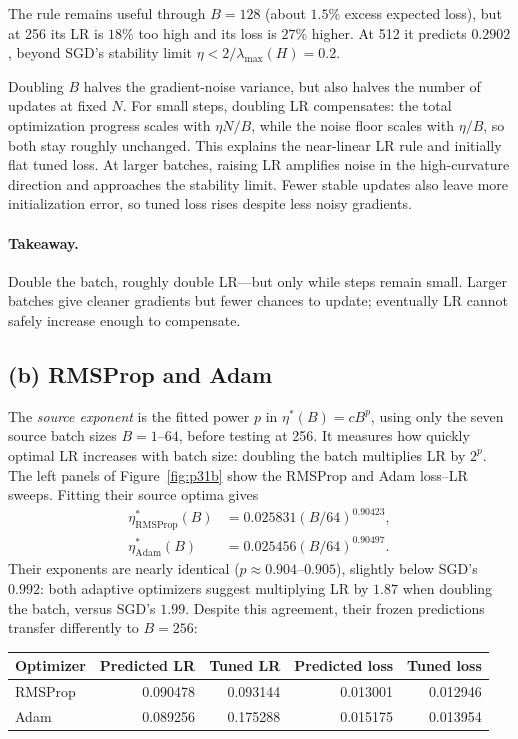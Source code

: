 \documentclass{article}
\begin{document}
The rule remains useful through $B=128$ (about $1.5\%$ excess expected
loss), but at 256 its LR is $18\%$ too high and its loss is $27\%$ higher.
At 512 it predicts $0.2902$, beyond SGD's stability limit
$\eta<2/\lambda_{\max}(H)=0.2$.

Doubling $B$ halves the gradient-noise variance, but also halves the
number of updates at fixed $N$. For small steps, doubling LR compensates:
the total optimization progress scales with $\eta N/B$, while the noise
floor scales with $\eta/B$, so both stay roughly unchanged. This explains
the near-linear LR rule and initially flat tuned loss. At larger batches,
raising LR amplifies noise in the high-curvature direction and approaches
the stability limit. Fewer stable updates also leave more initialization
error, so tuned loss rises despite less noisy gradients.

\paragraph{Takeaway.} Double the batch, roughly double LR---but only while
steps remain small. Larger batches give cleaner gradients but fewer chances
to update; eventually LR cannot safely increase enough to compensate.

\subsection{(b) RMSProp and Adam}

The \emph{source exponent} is the fitted power $p$ in $\eta^*(B)=cB^p$,
using only the seven source batch sizes $B=1$--$64$, before testing at 256.
It measures how quickly optimal LR increases with batch size:
doubling the batch multiplies LR by $2^p$.
The left panels of Figure~\ref{fig:p31b} show the RMSProp and Adam
loss--LR sweeps. Fitting their source optima gives
\[
\begin{aligned}
\eta^*_{\mathrm{RMSProp}}(B)&=0.025831(B/64)^{0.90423},\\
\eta^*_{\mathrm{Adam}}(B)&=0.025456(B/64)^{0.90497}.
\end{aligned}
\]
Their exponents are nearly identical ($p\approx0.904$--$0.905$), slightly
below SGD's $0.992$: both adaptive optimizers suggest multiplying LR by
$1.87$ when doubling the batch, versus SGD's $1.99$. Despite this agreement,
their frozen predictions transfer differently to $B=256$:

\begin{center}
\small
\begin{tabular}{lrrrr}
\toprule
Optimizer & Predicted LR & Tuned LR & Predicted loss & Tuned loss \\
\midrule
RMSProp & 0.090478 & 0.093144 & 0.013001 & 0.012946 \\
Adam & 0.089256 & 0.175288 & 0.015175 & 0.013954 \\
\bottomrule
\end{tabular}
\end{center}
\end{document}
